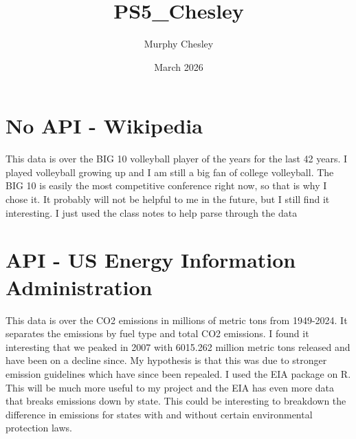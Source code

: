 \documentclass{article}
\title{PS5_Chesley}
\author{Murphy Chesley}
\date{March 2026}
\begin{document}
\maketitle

\section{No API - Wikipedia}
This data is over the BIG 10 volleyball player of the years for the last 42 years. I played volleyball growing up and I am still a big fan of college volleyball. The BIG 10 is easily the most competitive conference right now, so that is why I chose it. It probably will not be helpful to me in the future, but I still find it interesting. I just used the class notes to help parse through the data 

\section{API - US Energy Information Administration}
This data is over the CO2 emissions in millions of metric tons from 1949-2024. It separates the emissions by fuel type and total CO2 emissions. I found it interesting that we peaked in 2007 with 6015.262 million metric tons released and have been on a decline since. My hypothesis is that this was due to stronger emission guidelines which have since been repealed. I used the EIA package on R.  This will be much more useful to my project and the EIA has even more data that breaks emissions down by state. This could be interesting to breakdown the difference in emissions for states with and without certain environmental protection laws.
\end{document}
